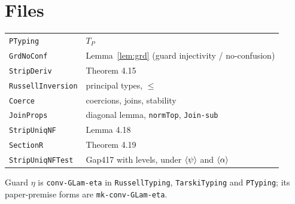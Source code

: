 \documentclass[10pt]{article}
\newcommand{\TP}{T_P}
\newcommand{\glam}[2]{\langle #1\rangle #2}
\newcommand{\llam}[1]{\langle\alpha\rangle #1}
\newcommand{\agda}[1]{\texttt{#1}}
\theoremstyle{remark}
\begin{document}
\section{Files}

\begin{center}
\begin{tabular}{@{}ll@{}}
\toprule
\agda{PTyping} & $\TP$ \\
\agda{GrdNoConf} & Lemma~\ref{lem:grd} (guard injectivity / no-confusion) \\
\agda{StripDeriv} & Theorem 4.15 \\
\agda{RussellInversion} & principal types, $\le$ \\
\agda{Coerce} & coercions, joins, stability \\
\agda{JoinProps} & diagonal lemma, \agda{normTop}, \agda{Join-sub} \\
\agda{StripUniqNF} & Lemma 4.18 \\
\agda{SectionR} & Theorem 4.19 \\
\agda{StripUniqNFTest} & Gap417 with levels, under $\glam\psi$ and $\llam$ \\
\bottomrule
\end{tabular}
\end{center}
Guard $\eta$ is \agda{conv-GLam-eta} in \agda{RussellTyping},
\agda{TarskiTyping} and \agda{PTyping}; its paper-premise forms are
\agda{mk-conv-GLam-eta}.
\end{document}
